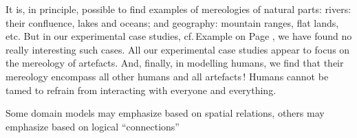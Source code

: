 \btosem
{}\label{phys-conc}
\begynd
\pind It is, in principle, possible to find examples of \nyl mereologies of
      natural parts:
\begynd
\pind rivers: their confluence, lakes and oceans; and
\pind geography: mountain ranges, flat lands, etc.
\afslut
\pind But in our experimental case studies,
      cf.\,Example on Page \pageref{page:UoD}, \nyl we have found no
      really interesting such cases.
\pind All our  experimental case studies appear\ysfchg{ } to focus on \nyl the
      mereology of artefacts.
\mnewfoil
\pind And, finally, in modelling humans,
\begynd
\pind we find that their mereology encompass 
\begynd
\pind all other humans
\pind and all artefacts\,!
\afslut
\pind Humans cannot be tamed to refrain from interacting \nyl  with everyone
      and everything.
\afslut
\afslut
\etosem

\begynd
\pind Some domain models may emphasize \nyl  {}
      based on spatial relations,
\pind others may emphasize \nyl  {}  based on
      logical ``connections''
\afslut
\mnewfoil

